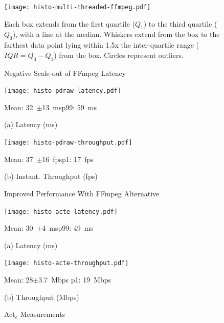 \begin{figure}
\centering
\texttt{[image: histo-multi-threaded-ffmpeg.pdf]}
\begin{captext}
  Each box extends from the first quartile ($Q_1$) to the third
  quartile ($Q_3$), with a line at the median. Whiskers extend from
  the box to the farthest data point lying within 1.5x the
  inter-quartile range ($IQR = Q_3-Q_1$) from the box. Circles
  represent outliers.
\end{captext}
\vspace{-0.1in}
\caption{\small Negative Scale-out of FFmpeg Latency}
\label{fig:ffmpeg-threads-box-plot2}
\end{figure}


\begin{figure}
\centering
\begin{minipage}[b]{0.49\linewidth}
\centering
\texttt{[image: histo-pdraw-latency.pdf]}\\
\begin{captext}
\centering
Mean: 32~$\pm$13~ms\hspace{0.1in}p99: 59~ms\\
\end{captext}
{\small (a) Latency (ms)}
\end{minipage}
\begin{minipage}[b]{0.49\linewidth}
\centering
\texttt{[image: histo-pdraw-throughput.pdf]}\\
\begin{captext}
\centering
Mean: 37~$\pm$16~fps\hspace{0.1in}p1: 17~fps\\
\end{captext}
{\small (b) Instant. Throughput (fps)}
\end{minipage}
\vspace{-0.1in}
\caption{\small Improved Performance With FFmpeg Alternative}
\label{fig:pdraw-histo}
\vspace{-0.1in}
\end{figure}

\begin{figure}
\centering
\begin{minipage}[b]{0.49\linewidth}
\centering
\texttt{[image: histo-acte-latency.pdf]}\\
\begin{captext}
\centering
Mean: 30~$\pm$4~ms\hspace{0.1in}p99: 49~ms\\
\end{captext}
{\small (a) Latency (ms)}
\end{minipage}
\begin{minipage}[b]{0.49\linewidth}
\centering
\texttt{[image: histo-acte-throughput.pdf]}\\
\begin{captext}
\centering
Mean: 28$\pm$3.7~Mbps p1: 19~Mbps\\
\end{captext}
{\small (b) Throughput (Mbps)}
\end{minipage}
\vspace{-0.15in}
\caption{\small Act${_e}$ Measurements}
\label{fig:c2d-net}
\end{figure}


